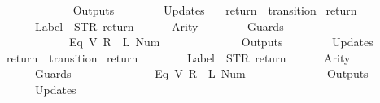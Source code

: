 \begin{isabellebody}
\ \ \ \ \ \ {\isacharbrackright}{\isacharcomma}\isanewline
\ \ \ \ \ \ Outputs\ {\isacharequal}\ {\isacharbrackleft}{\isacharbrackright}{\isacharcomma}\isanewline
\ \ \ \ \ \ Updates\ {\isacharequal}\ {\isacharbrackleft}{\isacharbrackright}\isanewline
{\isasymrparr}{\isachardoublequoteclose}\isanewline
\isanewline
{}\isamarkupfalse%
\ {\isachardoublequoteopen}return{}{\isachardoublequoteclose}\ {\isacharcolon}{\isacharcolon}\ {\isachardoublequoteopen}transition{\isachardoublequoteclose}\ \isanewline
{\isachardoublequoteopen}return{}\ {\isasymequiv}\ {\isasymlparr}\isanewline
\ \ \ \ \ \ Label\ {\isacharequal}\ STR\ {\isacharprime}{\isacharprime}return{\isacharprime}{\isacharprime}{\isacharcomma}\isanewline
\ \ \ \ \ \ Arity\ {\isacharequal}\ {}{\isacharcomma}\isanewline
\ \ \ \ \ \ Guards\ {\isacharequal}\ {\isacharbrackleft}\isanewline
\ \ \ \ \ \ \ \ \ \ \ \ {\isacharparenleft}Eq\ {\isacharparenleft}V\ {\isacharparenleft}R\ {}{\isacharparenright}{\isacharparenright}\ {\isacharparenleft}L\ {\isacharparenleft}Num\ {}{\isacharparenright}{\isacharparenright}{\isacharparenright}\isanewline
\ \ \ \ \ \ {\isacharbrackright}{\isacharcomma}\isanewline
\ \ \ \ \ \ Outputs\ {\isacharequal}\ {\isacharbrackleft}{\isacharbrackright}{\isacharcomma}\isanewline
\ \ \ \ \ \ Updates\ {\isacharequal}\ {\isacharbrackleft}{\isacharbrackright}\isanewline
{\isasymrparr}{\isachardoublequoteclose}\isanewline
\isanewline
{}\isamarkupfalse%
\ {\isachardoublequoteopen}return{}{\isachardoublequoteclose}\ {\isacharcolon}{\isacharcolon}\ {\isachardoublequoteopen}transition{\isachardoublequoteclose}\ \isanewline
{\isachardoublequoteopen}return{}\ {\isasymequiv}\ {\isasymlparr}\isanewline
\ \ \ \ \ \ Label\ {\isacharequal}\ STR\ {\isacharprime}{\isacharprime}return{\isacharprime}{\isacharprime}{\isacharcomma}\isanewline
\ \ \ \ \ \ Arity\ {\isacharequal}\ {}{\isacharcomma}\isanewline
\ \ \ \ \ \ Guards\ {\isacharequal}\ {\isacharbrackleft}\isanewline
\ \ \ \ \ \ \ \ \ \ \ \ {\isacharparenleft}Eq\ {\isacharparenleft}V\ {\isacharparenleft}R\ {}{\isacharparenright}{\isacharparenright}\ {\isacharparenleft}L\ {\isacharparenleft}Num\ {}{\isacharparenright}{\isacharparenright}{\isacharparenright}\isanewline
\ \ \ \ \ \ {\isacharbrackright}{\isacharcomma}\isanewline
\ \ \ \ \ \ Outputs\ {\isacharequal}\ {\isacharbrackleft}{\isacharbrackright}{\isacharcomma}\isanewline
\ \ \ \ \ \ Updates\ {\isacharequal}\ {\isacharbrackleft}{\isacharbrackright}\isanewline

\end{isabellebody}
